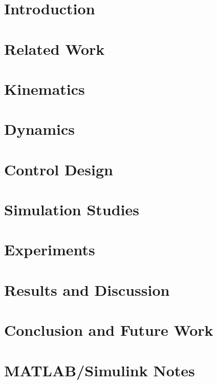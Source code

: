 \documentclass[12pt,a4paper]{report}
\begin{document}


\tableofcontents
\listoffigures
\listoftables
\clearpage


% 

\chapter{Introduction}


\chapter{Related Work}


\chapter{Kinematics}


\chapter{Dynamics}


\chapter{Control Design}


\chapter{Simulation Studies}


\chapter{Experiments}


\chapter{Results and Discussion}


\chapter{Conclusion and Future Work}


\clearpage


\appendix
\chapter{MATLAB/Simulink Notes}

\end{document}
